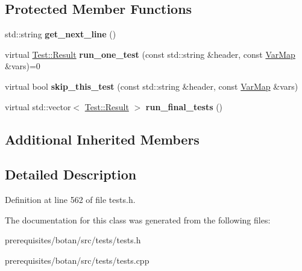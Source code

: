 \subsection*{Protected Member Functions}
\begin{DoxyCompactItemize}
\item 
\mbox{\label{class_botan___tests_1_1_text___based___test_a0835fe149240327ae18908b6530ee5c7}} 
std\+::string {\bfseries get\+\_\+next\+\_\+line} ()
\item 
\mbox{\label{class_botan___tests_1_1_text___based___test_a2a683dc6ccde64f3d3b3acf940b5d1a1}} 
virtual \mbox{\hyperlink{class_botan___tests_1_1_test_1_1_result}{Test\+::\+Result}} {\bfseries run\+\_\+one\+\_\+test} (const std\+::string \&header, const \mbox{\hyperlink{class_botan___tests_1_1_var_map}{Var\+Map}} \&vars)=0
\item 
\mbox{\label{class_botan___tests_1_1_text___based___test_a8082cc2dfa8bd13253114d870acc44e9}} 
virtual bool {\bfseries skip\+\_\+this\+\_\+test} (const std\+::string \&header, const \mbox{\hyperlink{class_botan___tests_1_1_var_map}{Var\+Map}} \&vars)
\item 
\mbox{\label{class_botan___tests_1_1_text___based___test_a9357f3f6ee932b1b32d25a0bb3b01cc7}} 
virtual std\+::vector$<$ \mbox{\hyperlink{class_botan___tests_1_1_test_1_1_result}{Test\+::\+Result}} $>$ {\bfseries run\+\_\+final\+\_\+tests} ()
\end{DoxyCompactItemize}
\subsection*{Additional Inherited Members}


\subsection{Detailed Description}


Definition at line 562 of file tests.\+h.



The documentation for this class was generated from the following files\+:\begin{DoxyCompactItemize}
\item 
prerequisites/botan/src/tests/tests.\+h\item 
prerequisites/botan/src/tests/tests.\+cpp\end{DoxyCompactItemize}
